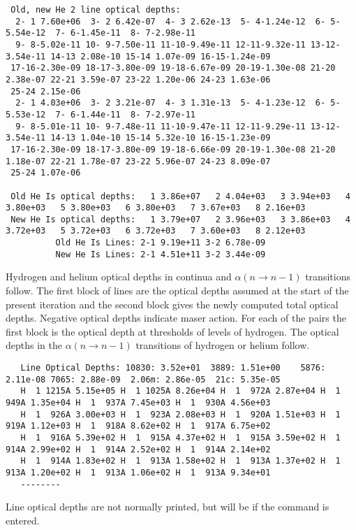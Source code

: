 {\begin{verbatim}
 Old, new He 2 line optical depths:
  2- 1 7.60e+06  3- 2 6.42e-07  4- 3 2.62e-13  5- 4-1.24e-12  6- 5-5.54e-12  7- 6-1.45e-11  8- 7-2.98e-11
  9- 8-5.02e-11 10- 9-7.50e-11 11-10-9.49e-11 12-11-9.32e-11 13-12-3.54e-11 14-13 2.08e-10 15-14 1.07e-09 16-15-1.24e-09
 17-16-2.30e-09 18-17-3.80e-09 19-18-6.67e-09 20-19-1.30e-08 21-20 2.38e-07 22-21 3.59e-07 23-22 1.20e-06 24-23 1.63e-06
 25-24 2.15e-06
  2- 1 4.03e+06  3- 2 3.21e-07  4- 3 1.31e-13  5- 4-1.23e-12  6- 5-5.53e-12  7- 6-1.44e-11  8- 7-2.97e-11
  9- 8-5.01e-11 10- 9-7.48e-11 11-10-9.47e-11 12-11-9.29e-11 13-12-3.54e-11 14-13 1.04e-10 15-14 5.32e-10 16-15-1.23e-09
 17-16-2.30e-09 18-17-3.80e-09 19-18-6.66e-09 20-19-1.30e-08 21-20 1.18e-07 22-21 1.78e-07 23-22 5.96e-07 24-23 8.09e-07
 25-24 1.07e-06

 Old He Is optical depths:   1 3.86e+07   2 4.04e+03   3 3.94e+03   4 3.80e+03   5 3.80e+03   6 3.80e+03   7 3.67e+03   8 2.16e+03
 New He Is optical depths:   1 3.79e+07   2 3.96e+03   3 3.86e+03   4 3.72e+03   5 3.72e+03   6 3.72e+03   7 3.60e+03   8 2.12e+03
          Old He Is Lines: 2-1 9.19e+11 3-2 6.78e-09
          New He Is Lines: 2-1 4.51e+11 3-2 3.44e-09
\end{verbatim}
}

Hydrogen and helium optical depths in continua and
$\alpha(n \to n-1)$ transitions follow.
The first block of lines are the optical depths assumed at the
start of the present iteration and the second block gives the newly computed
total optical depths.
Negative optical depths indicate maser action.
For
each of the pairs the first block is the optical depth at thresholds of
levels of hydrogen.
The optical depths in the $\alpha(n \to n-1)$ transitions of
hydrogen or helium follow.
{\setverbatimfontsize{\tiny}
\begin{verbatim}
   Line Optical Depths: 10830: 3.52e+01  3889: 1.51e+00    5876: 2.11e-08 7065: 2.88e-09  2.06m: 2.86e-05  21c: 5.35e-05
   H  1 1215A 5.15e+05 H  1 1025A 8.26e+04 H  1  972A 2.87e+04 H  1  949A 1.35e+04 H  1  937A 7.45e+03 H  1  930A 4.56e+03
   H  1  926A 3.00e+03 H  1  923A 2.08e+03 H  1  920A 1.51e+03 H  1  919A 1.12e+03 H  1  918A 8.62e+02 H  1  917A 6.75e+02
   H  1  916A 5.39e+02 H  1  915A 4.37e+02 H  1  915A 3.59e+02 H  1  914A 2.99e+02 H  1  914A 2.52e+02 H  1  914A 2.14e+02
   H  1  914A 1.83e+02 H  1  913A 1.58e+02 H  1  913A 1.37e+02 H  1  913A 1.20e+02 H  1  913A 1.06e+02 H  1  913A 9.34e+01
   --------
\end{verbatim}
}

 Line optical depths are not normally printed, but will be if the
   command is entered.
  
